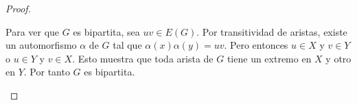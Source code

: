 \documentclass[12pt]{article}
\begin{document}
\begin{proof}
\begin{itemize}
    
    Para ver que $G$ es bipartita, sea $u v \in E(G).$ Por transitividad de aristas, existe un automorfismo $\alpha$ de $G$ tal que $\alpha(x) \alpha(y) = u v.$ Pero entonces $u\in X$ y $v \in Y$ o $u \in Y$ y $v \in X$. Esto muestra que toda arista de $G$ tiene un extremo en $X$ y otro en $Y$. Por tanto $G$ es bipartita. 
\end{itemize}
\end{proof}

\end{document}
